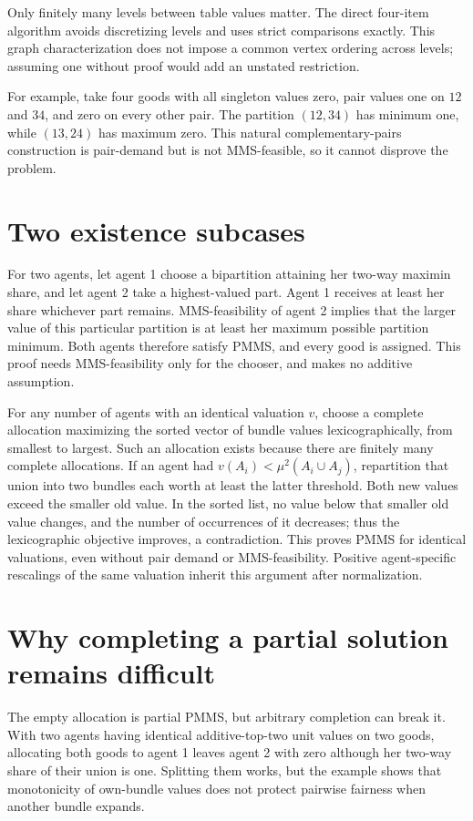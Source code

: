 \documentclass[11pt]{article}
\begin{document}
Only finitely many levels between table values matter. The direct four-item algorithm avoids discretizing levels and uses strict comparisons exactly. This graph characterization does not impose a common vertex ordering across levels; assuming one without proof would add an unstated restriction.

For example, take four goods with all singleton values zero, pair values one on $12$ and $34$, and zero on every other pair. The partition $(12,34)$ has minimum one, while $(13,24)$ has maximum zero. This natural complementary-pairs construction is pair-demand but is not MMS-feasible, so it cannot disprove the problem.

\section*{Two existence subcases}
For two agents, let agent 1 choose a bipartition attaining her two-way maximin share, and let agent 2 take a highest-valued part. Agent 1 receives at least her share whichever part remains. MMS-feasibility of agent 2 implies that the larger value of this particular partition is at least her maximum possible partition minimum. Both agents therefore satisfy PMMS, and every good is assigned. This proof needs MMS-feasibility only for the chooser, and makes no additive assumption.

For any number of agents with an identical valuation $v$, choose a complete allocation maximizing the sorted vector of bundle values lexicographically, from smallest to largest. Such an allocation exists because there are finitely many complete allocations. If an agent had $v(A_i)<\mu^2(A_i\cup A_j)$, repartition that union into two bundles each worth at least the latter threshold. Both new values exceed the smaller old value. In the sorted list, no value below that smaller old value changes, and the number of occurrences of it decreases; thus the lexicographic objective improves, a contradiction. This proves PMMS for identical valuations, even without pair demand or MMS-feasibility. Positive agent-specific rescalings of the same valuation inherit this argument after normalization.

\section*{Why completing a partial solution remains difficult}
The empty allocation is partial PMMS, but arbitrary completion can break it. With two agents having identical additive-top-two unit values on two goods, allocating both goods to agent 1 leaves agent 2 with zero although her two-way share of their union is one. Splitting them works, but the example shows that monotonicity of own-bundle values does not protect pairwise fairness when another bundle expands.
\end{document}

